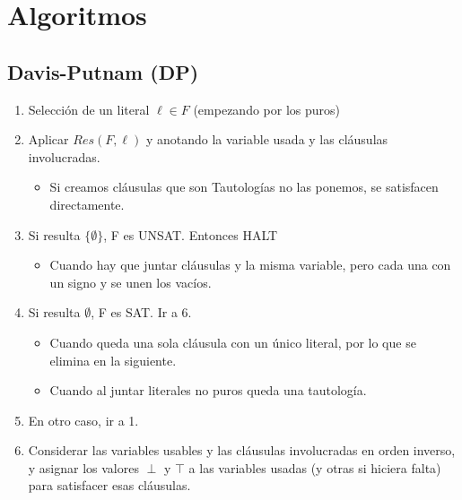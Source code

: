 \documentclass[12pt, twoside, openright]{report} %
\begin{document}
\section{Algoritmos}
\subsection{Davis-Putnam (DP)}

  \begin{enumerate}

  \item
    Selección de un literal \(\ell \in F\) (empezando por los puros)
  \item
    Aplicar \(Res(F,\ell)\) y anotando la variable usada y las cláusulas
    involucradas.

    \begin{itemize}
  
    \item
      Si creamos cláusulas que son Tautologías no las ponemos, se
      satisfacen directamente.
    \end{itemize}
  \item
    Si resulta $\{ \emptyset \}$, F es UNSAT. Entonces HALT

    \begin{itemize}
  
    \item
      Cuando hay que juntar cláusulas y la misma variable, pero cada una
      con un signo y se unen los vacíos.
    \end{itemize}
  \item
    Si resulta \(\emptyset\), F es SAT. Ir a 6.

    \begin{itemize}
  
    \item
      Cuando queda una sola cláusula con un único literal, por lo que se
      elimina en la siguiente.
    \item
      Cuando al juntar literales no puros queda una tautología.
    \end{itemize}
  \item
    En otro caso, ir a 1.
  \item
    Considerar las variables usables y las cláusulas involucradas en
    orden inverso, y asignar los valores \(\perp\) y \(\top\) a las
    variables usadas (y otras si hiciera falta) para satisfacer esas
    cláusulas.
  \end{enumerate}
\end{document}
